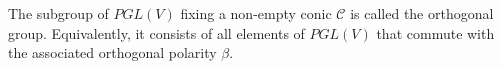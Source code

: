 The subgroup of $PGL(V)$ fixing a non-empty conic $\mathcal{C}$ is called the orthogonal group. Equivalently, it consists of all elements of $PGL(V)$ that commute with the associated orthogonal polarity $\beta$.
